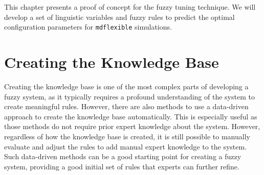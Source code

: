 \newcommand{\crispTreeNode}[2]{
    \begin{tikzpicture}
        \begin{axis}%
            [
                title = {Crisp Split: $#1 \leq #2$},
                width=4.5cm,
                height=3cm,
                axis lines=center,
                xlabel={#1},
                x label style={at={(axis description cs:0.9,-0.1)},anchor=north},
                ylabel=$\mu$,
                y label style={at={(axis description cs:0.5,1)},anchor=south},
                xmin=-5,
                xmax=5,
                xtick={},
                xticklabels= {},
                ytick={},
                yticklabels={},
                extra x ticks={0},
                extra x tick labels={#2},
                ymin=-0.1,
                ymax=1.1,
                samples=50,
                extra y ticks={1},
                every axis plot/.append style={thick}
            ]
            \addplot[red,domain=-5:-0.6] {step(x,0,-1)};
            \addplot[blue,domain=0.6:5] {step(x,0,1)};
            \addplot[red,domain=0.6:5] {step(x,0,-1)};
            \addplot[blue,domain=-5:-0.6] {step(x,0,1)};

            \node[draw,draw=black,circle,inner sep=1pt,minimum width=3pt,thick] at (axis cs:0,1) {};
            \node[draw,draw=black,circle,inner sep=1pt,minimum width=3pt,thick] at (axis cs:0,0) {};

            \node[anchor=center, red] at (axis cs:-2.9,0.6) {$#1 \leq #2$};
            \node[anchor=center, blue] at (axis cs:3.1,0.6) {$#1 > #2$};
        \end{axis}

    \end{tikzpicture}
}



This chapter presents a proof of concept for the fuzzy tuning technique. We will develop a set of linguistic variables and fuzzy rules to predict the optimal configuration parameters for \texttt{\gls{mdflexible}} simulations.

\section{Creating the Knowledge Base}

Creating the knowledge base is one of the most complex parts of developing a fuzzy system, as it typically requires a profound understanding of the system to create meaningful rules. However, there are also methods to use a data-driven approach to create the knowledge base automatically. This is especially useful as those methods do not require prior expert knowledge about the system. However, regardless of how the knowledge base is created, it is still possible to manually evaluate and adjust the rules to add manual expert knowledge to the system. Such data-driven methods can be a good starting point for creating a fuzzy system, providing a good initial set of rules that experts can further refine.

